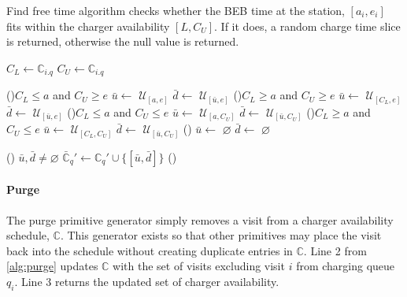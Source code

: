 \documentclass[11pt,a4paper,final]{article}
\newcommand{\C}{\mathbb{C}}                 %
\newcommand{\U}{\mathcal{U}}                %
\begin{document}
\begin{algorithm}[H]
\caption{Find free time algorithm checks whether the BEB time at the station, $[a_i, e_i]$ fits within the charger availability $[L,C_U]$. If it does, a random charge time slice is returned, otherwise the null value is returned.}
\label{alg:find-free-time}
    \LinesNumbered
    \KwIn{$(\C, i, q, a, e)$}
    \KwOut{($\bar{\C}, \bar{u}, \bar{d})$}

    \Begin
    { 
      $C_L \leftarrow \C_{i.q}$\;
      $C_U \leftarrow \C_{i.q}$\;

      \If(){$C_L \leq a$ and $C_U \geq e$}
      {
        $\bar{u}\leftarrow$ $\U_{[a,e]}$\;
        $\bar{d}\leftarrow$ $\U_{[\bar{u},e]}$\;
      }
      \ElseIf(){$C_L \ge a$ and $C_U \geq e$}
      {
        $\bar{u}\leftarrow$ $\U_{[C_L,e]}$\;
        $\bar{d}\leftarrow$ $\U_{[\bar{u},e]}$\;
      }
      \ElseIf(){$C_L \leq a$ and $C_U \le e$}
      {
        $\bar{u}\leftarrow$ $\U_{[a,C_U]}$\;
        $\bar{d}\leftarrow$ $\U_{[\bar{u},C_U]}$\;
      }
      \ElseIf(){$C_L \ge a$ and $C_U \le e$}
      {
        $\bar{u}\leftarrow$ $\U_{[C_L,C_U]}$\;
        $\bar{d}\leftarrow$ $\U_{[\bar{u},C_U]}$\;
      }
      \Else()
      {
        $\bar{u}\leftarrow$ $\varnothing$\;
        $\bar{d}\leftarrow$ $\varnothing$\;
      }

      \If () {$\bar{u},\bar{d} \ne \varnothing$}
      {
        $\bar{\C}_q' \leftarrow \C_q' \cup \{[\bar{u},\bar{d}]\}$
      }
      \Else()
      {
      }
    }
\end{algorithm}

\paragraph{Purge}
\label{sec:purge}
The purge primitive generator simply removes a visit from a charger availability schedule, \(\C\). This generator exists
so that other primitives may place the visit back into the schedule without creating duplicate entries in \(\C\). Line 2
from \ref{alg:purge} updates \(\C\) with the set of visits excluding visit \(i\) from charging queue \(q_i\). Line 3 returns
the updated set of charger availability.
\end{document}
